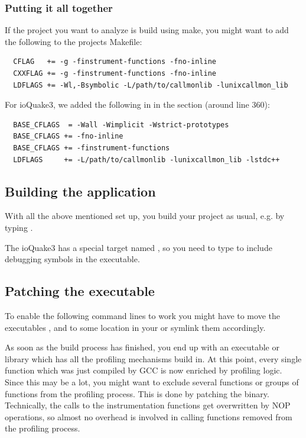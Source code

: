 \subsubsection{Putting it all together} If the project you want to analyze is build using make, you might want to add the following to the projects Makefile:

\begin{verbatim}
  CFLAG   += -g -finstrument-functions -fno-inline 
  CXXFLAG += -g -finstrument-functions -fno-inline 
  LDFLAGS += -Wl,-Bsymbolic -L/path/to/callmonlib -lunixcallmon_lib
\end{verbatim}

For ioQuake3, we added the following in  in the  section (around line 360):

\begin{verbatim}
  BASE_CFLAGS  = -Wall -Wimplicit -Wstrict-prototypes
  BASE_CFLAGS += -fno-inline
  BASE_CFLAGS += -finstrument-functions 
  LDFLAGS     += -L/path/to/callmonlib -lunixcallmon_lib -lstdc++
\end{verbatim}

\subsection{Building the application} With all the above mentioned set up, you build your project as usual, e.g. by typing .

The ioQuake3 has a special target named , so you need to type  to include debugging symbols in the executable.

\subsection{Patching the executable} To enable the following command lines to work you might have to move the executables  ,  and  to some location in your  or symlink them accordingly.

As soon as the build process has finished, you end up with an executable or library which has all the profiling mechanisms build in. At this point, every single function which was just compiled by GCC is now enriched by profiling logic. Since this may be a lot, you might want to exclude several functions or groups of functions from the profiling process. This is done by patching the binary. Technically, the calls to the instrumentation functions get overwritten by NOP operations, so almost no overhead is involved in calling functions removed from the profiling process.


